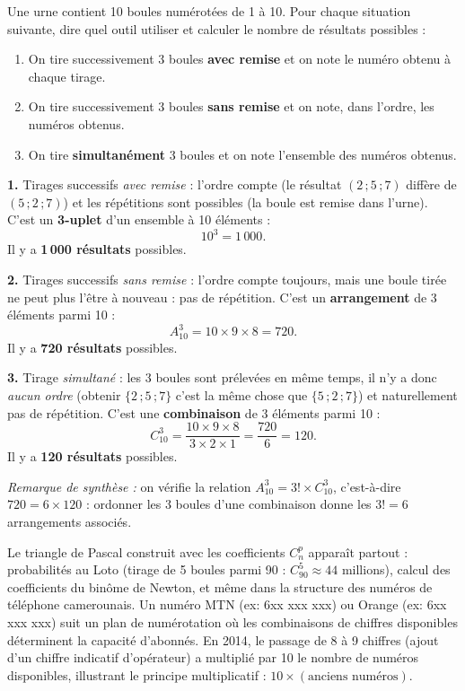 \documentclass[11pt]{article}
\begin{document}
\begin{exoresolu}
Une urne contient 10 boules numérotées de 1 à 10. Pour chaque situation suivante, dire quel outil utiliser et calculer le nombre de résultats possibles :
\begin{enumerate}
\item On tire successivement 3 boules \textbf{avec remise} et on note le numéro obtenu à chaque tirage.
\item On tire successivement 3 boules \textbf{sans remise} et on note, dans l'ordre, les numéros obtenus.
\item On tire \textbf{simultanément} 3 boules et on note l'ensemble des numéros obtenus.
\end{enumerate}
\tcblower
\textbf{1.} Tirages successifs \emph{avec remise} : l'ordre compte (le résultat $(2\,;5\,;7)$ diffère de $(5\,;2\,;7)$) et les répétitions sont possibles (la boule est remise dans l'urne). C'est un \textbf{3-uplet} d'un ensemble à 10 éléments :
\[ 10^3=1\,000. \]
Il y a \textbf{1\,000 résultats} possibles.

\textbf{2.} Tirages successifs \emph{sans remise} : l'ordre compte toujours, mais une boule tirée ne peut plus l'être à nouveau : pas de répétition. C'est un \textbf{arrangement} de 3 éléments parmi 10 :
\[ A_{10}^3=10\times 9\times 8=720. \]
Il y a \textbf{720 résultats} possibles.

\textbf{3.} Tirage \emph{simultané} : les 3 boules sont prélevées en même temps, il n'y a donc \emph{aucun ordre} (obtenir $\{2\,;5\,;7\}$ c'est la même chose que $\{5\,;2\,;7\}$) et naturellement pas de répétition. C'est une \textbf{combinaison} de 3 éléments parmi 10 :
\[ C_{10}^3=\frac{10\times 9\times 8}{3\times 2\times 1}=\frac{720}{6}=120. \]
Il y a \textbf{120 résultats} possibles.

\emph{Remarque de synthèse :} on vérifie la relation $A_{10}^3=3!\times C_{10}^3$, c'est-à-dire $720=6\times 120$ : ordonner les 3 boules d'une combinaison donne les $3!=6$ arrangements associés.
\end{exoresolu}

\begin{savaistu}
Le triangle de Pascal construit avec les coefficients $C_n^p$ apparaît partout : probabilités au Loto (tirage de 5 boules parmi 90 : $C_{90}^5 \approx 44$ millions), calcul des coefficients du binôme de Newton, et même dans la structure des numéros de téléphone camerounais. Un numéro MTN (ex: 6xx xxx xxx) ou Orange (ex: 6xx xxx xxx) suit un plan de numérotation où les combinaisons de chiffres disponibles déterminent la capacité d'abonnés. En 2014, le passage de 8 à 9 chiffres (ajout d'un chiffre indicatif d'opérateur) a multiplié par 10 le nombre de numéros disponibles, illustrant le principe multiplicatif : $10 \times (\text{anciens numéros})$.
\end{savaistu}
\end{document}
